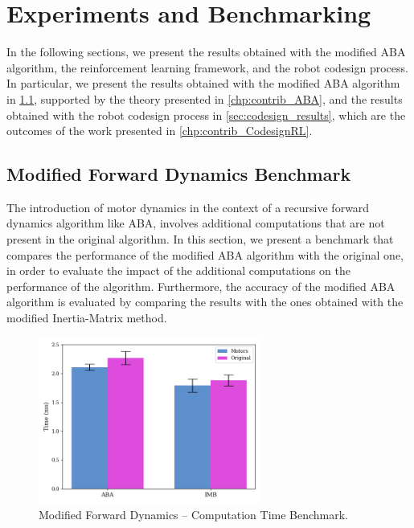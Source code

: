 \chapter{Experiments and Benchmarking}
\label{chp:contrib_ResultsDiscussion}

In the following sections, we present the results obtained with the modified \ac{ABA} algorithm, the reinforcement learning framework, and the robot codesign process. In particular, we present the results obtained with the modified \ac{ABA} algorithm in \cref{sec:results_fd_aba}, supported by the theory presented in \cref{chp:contrib_ABA},
and the results obtained with the robot codesign process in \cref{sec:codesign_results}, which are the outcomes of the work presented in \cref{chp:contrib_CodesignRL}.

\section{Modified Forward Dynamics Benchmark}
\label{sec:results_fd_aba}

The introduction of motor dynamics in the context of a recursive forward dynamics algorithm like \ac{ABA}, involves additional computations that are not present in the original algorithm. In this section, we present a benchmark that compares the performance of the modified \ac{ABA} algorithm with the original one, in order to evaluate the impact of the additional computations on the performance of the algorithm. Furthermore, the accuracy of the modified \ac{ABA} algorithm is evaluated by comparing the results with the ones obtained with the modified Inertia-Matrix method.

\begin{figure}[h]
    \centering
    \caption{Modified Forward Dynamics -- Computation Time Benchmark.}
    \label{fig:fd_benchmark}
    \includegraphics[width=0.65\textwidth]{Images/Results/time_comparison_aba.png}
\end{figure}

